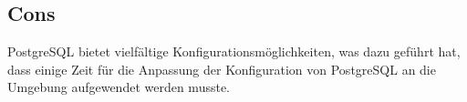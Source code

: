 \subsection{Cons}

PostgreSQL bietet vielfältige Konfigurationsmöglichkeiten, was dazu geführt hat, dass einige Zeit für die Anpassung der Konfiguration von PostgreSQL an die Umgebung aufgewendet werden musste.